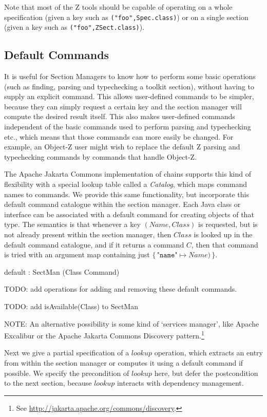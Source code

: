 \documentclass{llncs} %
\begin{document}
Note that most of the Z tools should be capable of operating
on a whole specification (given a key such as \texttt{("foo",Spec.class)})
or on a single section (given a key such as \texttt{("foo",ZSect.class)}).


\subsection{Default Commands}

It is useful for Section Managers to know how to perform some basic 
operations (such as finding, parsing and typechecking a toolkit section),
without having to supply an explicit command.  This allows user-defined
commands to be simpler, because they can simply request a certain key and
the section manager will compute the desired result itself.  This also
makes user-defined commands independent of the basic commands used to
perform parsing and typechecking etc., which means that those commands
can more easily be changed.  For example, an Object-Z user might wish
to replace the default Z parsing and typechecking commands by commands
that handle Object-Z.  

The Apache Jakarta Commons implementation of chains supports this
kind of flexibility with a special lookup table called a \emph{Catalog},
which maps command names to commands.  We provide this same
functionality, but incorporate this default command catalogue within 
the section manager.  Each Java class or interface can be associated
with a default command for creating objects of that type.
The semantics is that whenever a key $(Name,Class)$
is requested, but is not already present within the section manager, then
$Class$ is looked up in the default command catalogue, and if it returns
a command $C$, then that command is tried with an argument map containing
just $\{\, \texttt{"name"} \mapsto Name)\, \}$.

\begin{axdef}
  default : SectMan \fun (Class \ffun Command)
\end{axdef}

TODO: add operations for adding and removing these default commands. 

TODO: add isAvailable(Class) to SectMan

NOTE: An alternative possibility is some kind of `services manager', like
  Apache Excalibur or the Apache Jakarta Commons Discovery 
  pattern.\footnote{See \url{http://jakarta.apache.org/commons/discovery}.}


Next we give a partial specification of a $lookup$ operation, which
extracts an entry from within the section manager or computes it
using a default command if possible.  We specify the precondition
of $lookup$ here, but defer the postcondition to the next section, because
$lookup$ interacts with dependency management. 
\end{document}
